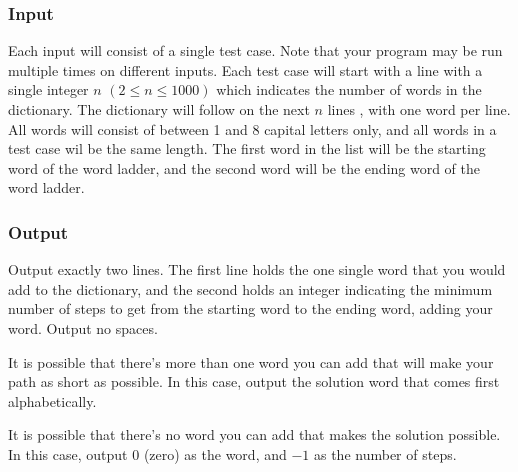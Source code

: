 \subsubsection{Input}
Each input will consist of a single test case.
Note that your program may be run multiple times on different inputs.
Each test case will start with a line with a single integer $n$ $(2 \le n \le 1000)$ which indicates the number of words in the dictionary.
The dictionary will follow on the next $n$ lines , with one word per line.
All words will consist of between 1 and 8 capital letters only, and all words in a test case wil be the same length.
The first word in the list will be the starting word of the word ladder, and the second word will be the ending word of the word ladder.


\subsubsection{Output}
Output exactly two lines.
The first line holds the one single word that you would add to the dictionary, and the second holds an integer indicating the minimum number of steps to get from the starting word to the ending word, adding your word. Output no spaces.

It is possible that there's more than one word you can add that will make your path as short as possible.
In this case, output the solution word that comes first alphabetically.

It is possible that there's no word you can add that makes the solution possible.
In this case, output $0$ (zero) as the word, and $-1$ as the number of steps.
